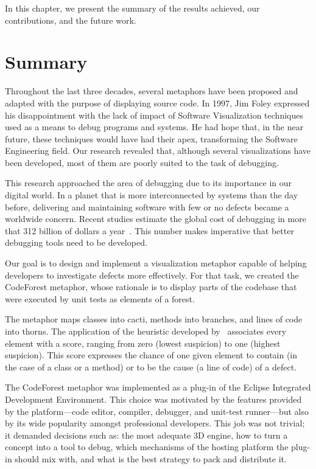 In this chapter, we present the summary of the results achieved, our
contributions, and the future work.

\section{Summary}

Throughout the last three decades, several metaphors have been proposed and
adapted with the purpose of displaying source code. In 1997, Jim Foley expressed
his disappointment with the lack of impact of Software Visualization
techniques~\cite{stasko1997software} used as a means to debug programs and
systems. He had hope that, in the near future, these techniques would have had
their apex, transforming the Software Engineering field. Our research revealed
that, although several visualizations have been developed, most of them are
poorly suited to the task of debugging.

This research approached the area of debugging due to its importance in our
digital world. In a planet that is more interconnected by systems than the day
before, delivering and maintaining software with few or no defects became a
worldwide concern. Recent studies estimate the global cost of debugging in more
that 312 billion of dollars a year~\cite{britton2013reversible}. This number
makes imperative that better debugging tools need to be developed.

Our goal is to design and implement a visualization metaphor capable of helping
developers to investigate defects more effectively. For that task, we created
the CodeForest metaphor, whose rationale is to display parts of the codebase that
were executed by unit tests as elements of a forest.

The metaphor maps classes into cacti, methods into branches, and lines of code
into thorns. The application of the heuristic developed
by~\cite{souza2012depuracao} associates every element with a score, ranging from
zero (lowest suspicion) to one (highest suspicion). This score expresses the
chance of one given element to contain (in the case of a class or a method) or
to be the cause (a line of code) of a defect.

The CodeForest metaphor was implemented as a plug-in of the Eclipse Integrated
Development Environment. This choice was motivated by the features provided by
the platform---code editor, compiler, debugger, and unit-test runner---but also
by its wide popularity amongst professional developers. This job was not
trivial; it demanded decisions such as: the most adequate 3D engine, how to turn
a concept into a tool to debug, which mechanisms of the hosting platform the plug-in
should mix with, and what is the best strategy to pack and distribute it.

